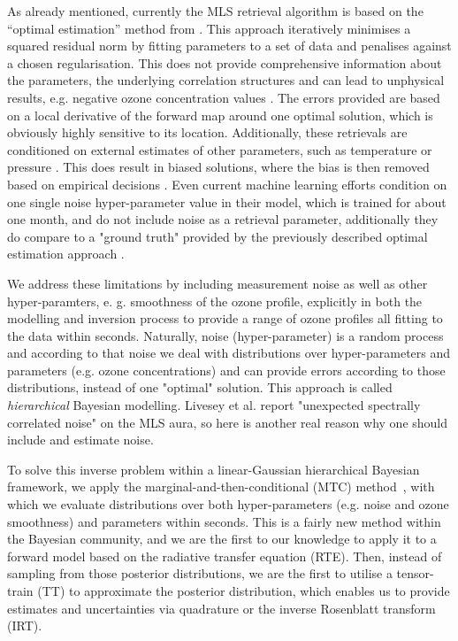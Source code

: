 As already mentioned, currently the MLS retrieval algorithm \cite{livesey2006retrieval} is based on the “optimal estimation” method from \cite{rodgers1976retrieval}.
This approach iteratively minimises a squared residual norm by fitting parameters to a set of data and penalises against a chosen regularisation.
This does not provide comprehensive information about the parameters, the underlying correlation structures and can lead to unphysical results, e.g. negative ozone concentration values \cite{MLSdata}.
The errors provided are based on a local derivative of the forward map around one optimal solution, which is obviously highly sensitive to its location.
Additionally, these retrievals are conditioned on external estimates of other parameters, such as temperature or pressure \cite{livesey2006retrieval}.
This does result in biased solutions, where the bias is then removed based on empirical decisions \cite{livesey2008ozonecarbonmono, Froidevaux2008snrozone}.
Even current machine learning efforts condition on one single noise hyper-parameter value in their model, which is trained for about one month, and do not include noise as a retrieval parameter, additionally they do compare to a "ground truth" provided by the previously described optimal estimation approach \cite{werner2023machlearn, bojkov2008NeuralNet}.

We address these limitations by including measurement noise as well as other hyper-paramters, e. g. smoothness of the ozone profile, explicitly in both the modelling and inversion process to provide a range of ozone profiles all fitting to the data within seconds.
Naturally, noise (hyper-parameter) is a random process and according to that noise we deal with distributions over hyper-parameters and parameters (e.g. ozone concentrations) and can provide errors according to those distributions, instead of one "optimal" solution.
This approach is called \textit{hierarchical} Bayesian modelling.
Livesey et al. \cite{livesey2006retrieval} report "unexpected spectrally correlated noise" on the MLS aura, so here is another real reason why one should include and estimate noise.

To solve this inverse problem within a linear-Gaussian hierarchical Bayesian framework, we apply the marginal-and-then-conditional (MTC) method~\cite{fox2016fast}, with which we evaluate distributions over both hyper-parameters (e.g. noise and ozone smoothness) and parameters within seconds.
This is a fairly new method within the Bayesian community, and we are the first to our knowledge to apply it to a forward model based on the radiative transfer equation (RTE).
Then, instead of sampling from those posterior distributions, we are the first to utilise a tensor-train (TT) to approximate the posterior distribution, which enables us to provide estimates and uncertainties via quadrature or the inverse Rosenblatt transform (IRT).

